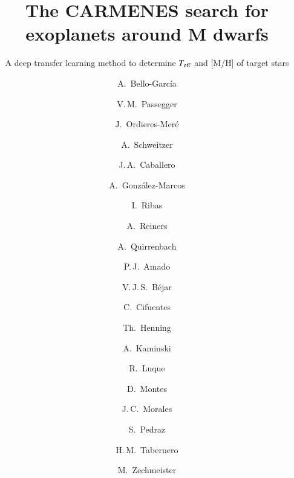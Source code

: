 \documentclass{aa}
\begin{document}
\title{The CARMENES search for exoplanets around M dwarfs}  
%
\subtitle{A deep transfer learning method to determine $T_{\rm eff}$ and [M/H] of target stars}

%
\author{A.~Bello-Garc\'ia\inst{\ref{ovi}}
        \and
        V.\,M.~Passegger\inst{\ref{iac},\ref{uiac},\ref{hs},\ref{ou}}
        \and
        J.~Ordieres-Mer\'e\inst{\ref{upm}}
        \and
        A.~Schweitzer\inst{\ref{hs}}
            \and
        J.\,A.~Caballero\inst{\ref{cab}}
        \and
        A.~Gonz\'alez-Marcos\inst{\ref{ur}}
        \and
        I.~Ribas\inst{\ref{ice},\ref{ieec}}
        \and
        A.~Reiners\inst{\ref{iag}}
        \and
        A.~Quirrenbach\inst{\ref{lsw}}
        \and
        P.\,J.~Amado\inst{\ref{iaa}}
        \and
        V.\,J.\,S.~B\'ejar\inst{\ref{iac},\ref{uiac}}
        \and 
        C.~Cifuentes\inst{\ref{cab}}
        \and
        Th.~Henning\inst{\ref{mpia}}
        \and
        A.~Kaminski\inst{\ref{lsw}}
        \and
        R.~Luque\inst{\ref{iaa},\ref{uch}}
        \and
        D.~Montes\inst{\ref{ucm}}
        \and
        J.\,C.~Morales\inst{\ref{ice},\ref{ieec}}
        \and
        S.~Pedraz\inst{\ref{caha}}
        \and 
        H.\,M.~Tabernero\inst{\ref{cab1}}
        \and
        M.~Zechmeister\inst{\ref{iag}}
        }
\end{document}
